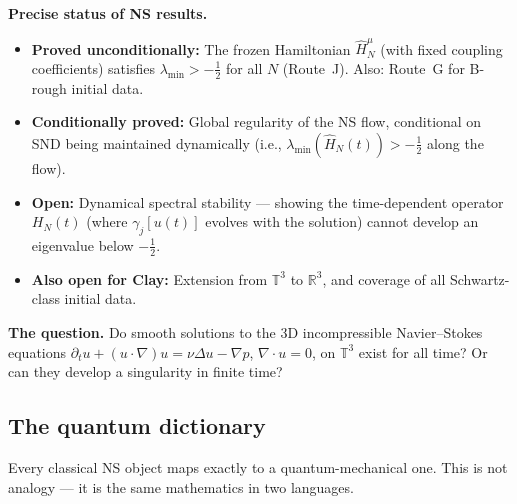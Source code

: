 \documentclass[12pt]{article}
\newcommand{\T}{\mathbb{T}}
\begin{document}
\begin{tcolorbox}[warnbox]
\textbf{Precise status of NS results.}
\begin{itemize}[itemsep=3pt]
  \item \textbf{Proved unconditionally:} The frozen Hamiltonian $\hat{H}_N^\mu$
        (with fixed coupling coefficients) satisfies $\lambda_{\min} > -\tfrac{1}{2}$
        for all $N$ (Route~J). Also: Route~G for B-rough initial data.
  \item \textbf{Conditionally proved:} Global regularity of the NS flow,
        conditional on SND being maintained dynamically
        (i.e., $\lambda_{\min}(\hat{H}_N(t)) > -\tfrac{1}{2}$ along the flow).
  \item \textbf{Open:} Dynamical spectral stability --- showing the
        time-dependent operator $H_N(t)$ (where $\gamma_j[u(t)]$ evolves
        with the solution) cannot develop an eigenvalue below $-\tfrac{1}{2}$.
  \item \textbf{Also open for Clay:} Extension from $\mathbb{T}^3$ to $\mathbb{R}^3$,
        and coverage of all Schwartz-class initial data.
\end{itemize}
\end{tcolorbox}

\label{sec:ns}

\textbf{The question.}
Do smooth solutions to the 3D incompressible Navier--Stokes equations
$\partial_t u + (u\cdot\nabla)u = \nu\Delta u - \nabla p$,
$\nabla\cdot u = 0$,
on $\T^3$ exist for all time?
Or can they develop a singularity in finite time?

\subsection{The quantum dictionary}
\label{sec:ns-dictionary}

Every classical NS object maps exactly to a quantum-mechanical one.
This is not analogy --- it is the same mathematics in two languages.
\end{document}
